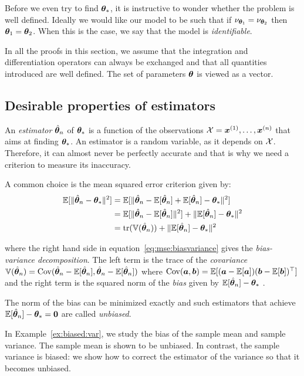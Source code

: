 Before we even try to find $\boldsymbol{\theta}_*$, it is instructive to wonder whether the
problem is well defined. Ideally we would like our model to be such that if
$\nu_{\boldsymbol{\theta}_1} = \nu_{\boldsymbol{\theta}_2}$ then $\boldsymbol{\theta}_1=\boldsymbol{\theta}_2$.
When this is the case, we say that the model is \emph{identifiable}.

In all the proofs in this section, we assume that the integration and
differentiation operators can always be exchanged and that all quantities
introduced are well defined. The set of parameters $\boldsymbol{\theta}$ is viewed as a
vector.

\subsection{Desirable properties of estimators}
\label{sec:desirable}
An \emph{estimator} $\hat{\boldsymbol{\theta}}_n$ of $\boldsymbol{\theta}_*$ is a function of the
observations $\mathcal{X} = \boldsymbol{x}^{(1)}, \dots, \boldsymbol{x}^{(n)}$ that aims at finding $\boldsymbol{\theta}_*$.
An estimator is a random variable, as it depends on $\mathcal{X}$. Therefore, it can almost never be perfectly accurate and that
is why we need a criterion to measure its inaccuracy.

A common choice is the mean squared error criterion given by:
\begin{align}
  \mathbb{E}[\|\hat{\boldsymbol{\theta}}_n - \boldsymbol{\theta}_*\|^2] &= \mathbb{E}[\|\hat{\boldsymbol{\theta}}_n - \mathbb{E}[\hat{\boldsymbol{\theta}}_n] + \mathbb{E}[\hat{\boldsymbol{\theta}}_n] - \boldsymbol{\theta}_*\|^2] \\
                                   &= \mathbb{E}[\|\hat{\boldsymbol{\theta}}_n - \mathbb{E}[\hat{\boldsymbol{\theta}}_n]\|^2] + \|\mathbb{E}[\hat{\boldsymbol{\theta}}_n] - \boldsymbol{\theta}_*\|^2  \\
                                         &= \mathop{\mathrm{tr}}(\mathbb{V}(\hat{\boldsymbol{\theta}}_n)) + \|\mathbb{E}[\hat{\boldsymbol{\theta}}_n] - \boldsymbol{\theta}_*\|^2 \label{eq:mse:biasvariance}
\end{align}

where the right hand side in equation~\ref{eq:mse:biasvariance} gives the
\emph{bias-variance decomposition}. The left term is the trace of the \emph{covariance} $\mathbb{V}(\hat{\boldsymbol{\theta}}_n) = \operatorname*{Cov}(\hat{\boldsymbol{\theta}}_n -
\mathbb{E}[\hat{\boldsymbol{\theta}}_n], \hat{\boldsymbol{\theta}}_n -
\mathbb{E}[\hat{\boldsymbol{\theta}}_n])$ where $\operatorname*{Cov}(\boldsymbol{a}, \boldsymbol{b}) = \mathbb{E}[(\boldsymbol{a} - \mathbb{E}[\boldsymbol{a}]) (\boldsymbol{b} -
\mathbb{E}[\boldsymbol{b}])^{\top}]$ and the right term is the squared norm of the \emph{bias} given by $\mathbb{E}[\hat{\boldsymbol{\theta}}_n] - \boldsymbol{\theta}_*$ .

The norm of the bias can be minimized exactly and such estimators that achieve $\mathbb{E}[\hat{\boldsymbol{\theta}}_n] - \boldsymbol{\theta}_* = \boldsymbol{0}$ are called \emph{unbiased}.

In Example~\ref{ex:biased:var}, we study the bias of the sample mean and sample variance. The sample mean is shown to be unbiased. In
contrast, the sample variance is biased: we show how to
correct the estimator of the variance so that it becomes unbiased.

